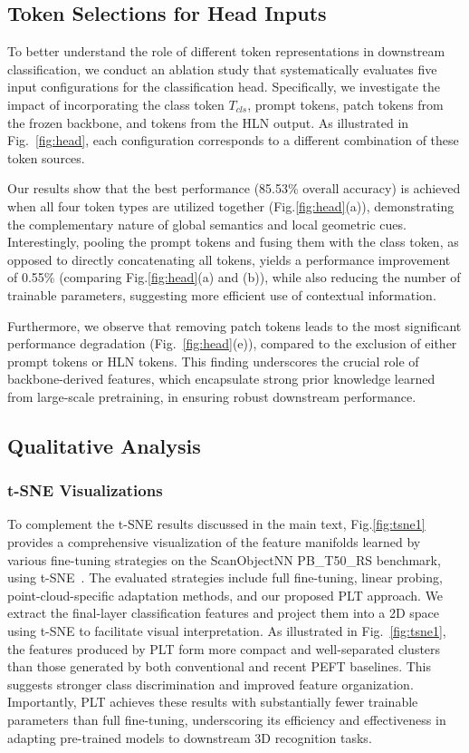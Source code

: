 \subsection{Token Selections for Head Inputs}  
To better understand the role of different token representations in downstream classification, we conduct an ablation study that systematically evaluates five input configurations for the classification head. Specifically, we investigate the impact of incorporating the class token $T_{cls}$, prompt tokens, patch tokens from the frozen backbone, and tokens from the HLN output. As illustrated in Fig.~\ref{fig:head}, each configuration corresponds to a different combination of these token sources.

Our results show that the best performance (85.53\% overall accuracy) is achieved when all four token types are utilized together (Fig.\ref{fig:head}(a)), demonstrating the complementary nature of global semantics and local geometric cues. Interestingly, pooling the prompt tokens and fusing them with the class token, as opposed to directly concatenating all tokens, yields a performance improvement of 0.55\% (comparing Fig.\ref{fig:head}(a) and (b)), while also reducing the number of trainable parameters, suggesting more efficient use of contextual information.

Furthermore, we observe that removing patch tokens leads to the most significant performance degradation (Fig.~\ref{fig:head}(e)), compared to the exclusion of either prompt tokens or HLN tokens. This finding underscores the crucial role of backbone-derived features, which encapsulate strong prior knowledge learned from large-scale pretraining, in ensuring robust downstream performance.

\subsection{Qualitative Analysis}

\subsubsection{t-SNE Visualizations}  
To complement the t-SNE results discussed in the main text, Fig.\ref{fig:tsne1} provides a comprehensive visualization of the feature manifolds learned by various fine-tuning strategies on the ScanObjectNN PB\_T50\_RS benchmark\cite{uy2019revisiting}, using t-SNE~\cite{van2008visualizing}. The evaluated strategies include full fine-tuning, linear probing, point-cloud-specific adaptation methods, and our proposed PLT approach. We extract the final-layer classification features and project them into a 2D space using t-SNE to facilitate visual interpretation. As illustrated in Fig.~\ref{fig:tsne1}, the features produced by PLT form more compact and well-separated clusters than those generated by both conventional and recent PEFT baselines. This suggests stronger class discrimination and improved feature organization. Importantly, PLT achieves these results with substantially fewer trainable parameters than full fine-tuning, underscoring its efficiency and effectiveness in adapting pre-trained models to downstream 3D recognition tasks.

